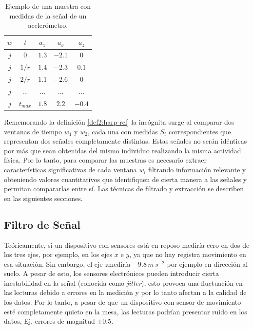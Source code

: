 \begin{table}[!tbph]
\begin{centering}
\begin{tabular}{|c|c|c|c|c|}
\hline 
$w$ & $t$ & $a_{x}$ & $a_{y}$ & $a_{z}$\tabularnewline
\hline 
\hline 
$j$ & $0$ & \texttt{$1.3$} & \texttt{$-2.1$} & \texttt{$0$}\tabularnewline
\hline 
$j$ & $1/r$ & \texttt{$1.4$} & \texttt{$-2.3$} & \texttt{$0.1$}\tabularnewline
\hline 
$j$ & $2/r$ & \texttt{$1.1$} & \texttt{$-2.6$} & \texttt{$0$}\tabularnewline
\hline 
$j$ & ... & \texttt{$...$} & \texttt{$...$} & \texttt{$...$}\tabularnewline
\hline 
$j$ & $t_{max}$ & \texttt{$1.8$} & \texttt{$2.2$} & \texttt{$-0.4$}\tabularnewline
\hline 
\end{tabular}
\par\end{centering}
\caption[Ejemplo de señales medidas de aceleración]{\label{tab4:ex-signal}Ejemplo de una muestra con medidas de la señal
de un acelerómetro.}
\end{table}

Rememorando la definición \ref{def2:harp-rel} la incógnita surge
al comparar dos ventanas de tiempo $w_{1}$ y $w_{2}$, cada una con
medidas $S_{i}$ correspondientes que representan dos señales completamente
distintas. Estas señales no serán idénticas por más que sean obtenidas
del mismo individuo realizando la misma actividad física. Por lo tanto,
para comparar las muestras es necesario extraer características significativas
de cada ventana $w_{i}$ filtrando información relevante y obteniendo
valores cuantitativos que identifiquen de cierta manera a las señales
y permitan compararlas entre sí. Las técnicas de filtrado y extracción
se describen en las siguientes secciones.

\subsection{Filtro de Señal}

\label{ssec44:filtering}Teóricamente, si un dispositivo con sensores
está en reposo mediría cero en dos de los tres ejes, por ejemplo,
en los ejes $x$ e $y$, ya que no hay registra movimiento en esa
situación. Sin embargo, el eje $z$mediría $-9.8\,m\,s^{-2}$ por
ejemplo en dirección al suelo. A pesar de esto, los sensores electrónicos
pueden introducir cierta inestabilidad en la señal (conocida como
\emph{jitter}), esto provoca una fluctuación en las lecturas debido
a errores en la medición y por lo tanto afectan a la calidad de los
datos. Por lo tanto, a pesar de que un dispositivo con sensor de movimiento
esté completamente quieto en la mesa, las lecturas podrían presentar
ruido en los datos, Ej. errores de magnitud $\pm0.5$. 

